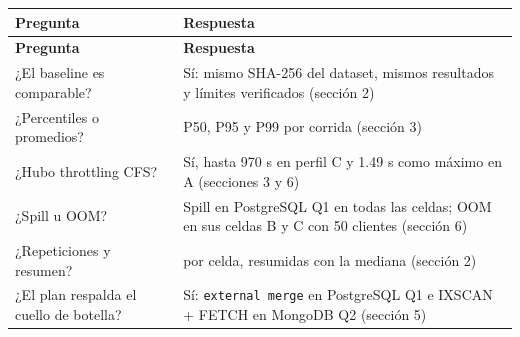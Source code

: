 \documentclass[11pt,letterpaper]{article}
\newcommand{\code}[1]{\texttt{#1}}
\begin{document}
{\footnotesize\setlength{\tabcolsep}{3pt}
\begin{longtable}{>{\raggedright\arraybackslash}p{}>{\raggedright\arraybackslash}p{}}
\toprule
\textbf{Pregunta} & \textbf{Respuesta} \\
\midrule
\endfirsthead
\toprule
\textbf{Pregunta} & \textbf{Respuesta} \\
\midrule
\endhead
¿El baseline es comparable? & Sí: mismo SHA-256 del dataset, mismos resultados y límites verificados (sección 2) \\
¿Percentiles o promedios? & P50, P95 y P99 por corrida (sección 3) \\
¿Hubo throttling CFS? & Sí, hasta 970 s en perfil C y 1.49 s como máximo en A (secciones 3 y 6) \\
¿Spill u OOM? & Spill en PostgreSQL Q1 en todas las celdas; OOM en sus celdas B y C con 50 clientes (sección 6) \\
¿Repeticiones y resumen? & 3 por celda, resumidas con la mediana (sección 2) \\
¿El plan respalda el cuello de botella? & Sí: \code{external merge} en PostgreSQL Q1 e IXSCAN + FETCH en MongoDB Q2 (sección 5) \\
\bottomrule
\end{longtable}}
\end{document}
